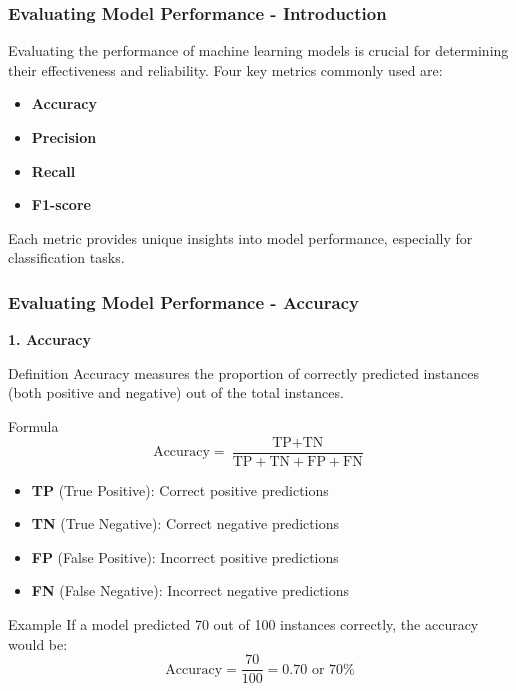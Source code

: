 \documentclass[aspectratio=169]{beamer}
\begin{document}
\begin{frame}[fragile]
    \frametitle{Evaluating Model Performance - Introduction}
    Evaluating the performance of machine learning models is crucial for determining their effectiveness and reliability. Four key metrics commonly used are:
    \begin{itemize}
        \item \textbf{Accuracy}
        \item \textbf{Precision}
        \item \textbf{Recall}
        \item \textbf{F1-score}
    \end{itemize}
    Each metric provides unique insights into model performance, especially for classification tasks.
\end{frame}

\begin{frame}[fragile]
    \frametitle{Evaluating Model Performance - Accuracy}
    \textbf{1. Accuracy}

    \begin{block}{Definition}
        Accuracy measures the proportion of correctly predicted instances (both positive and negative) out of the total instances.
    \end{block}

    \begin{block}{Formula}
        \begin{equation}
            \text{Accuracy} = \frac{\text{TP} + \text{TN}}{\text{TP} + \text{TN} + \text{FP} + \text{FN}} 
        \end{equation}
    \end{block}
    
    \begin{itemize}
        \item \textbf{TP} (True Positive): Correct positive predictions
        \item \textbf{TN} (True Negative): Correct negative predictions
        \item \textbf{FP} (False Positive): Incorrect positive predictions
        \item \textbf{FN} (False Negative): Incorrect negative predictions
    \end{itemize}

    \begin{block}{Example}
        If a model predicted 70 out of 100 instances correctly, the accuracy would be:
        \begin{equation}
            \text{Accuracy} = \frac{70}{100} = 0.70 \text{ or } 70\%
        \end{equation}
    \end{block}
\end{frame}
\end{document}

